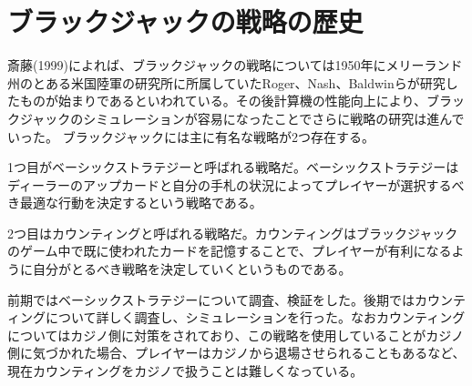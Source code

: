 
\section{ブラックジャックの戦略の歴史}
斎藤(1999)によれば、ブラックジャックの戦略については1950年にメリーランド州のとある米国陸軍の研究所に所属していたRoger、Nash、Baldwinらが研究したものが始まりであるといわれている。その後計算機の性能向上により、ブラックジャックのシミュレーションが容易になったことでさらに戦略の研究は進んでいった。
ブラックジャックには主に有名な戦略が2つ存在する。

1つ目がベーシックストラテジーと呼ばれる戦略だ。ベーシックストラテジーはディーラーのアップカードと自分の手札の状況によってプレイヤーが選択するべき最適な行動を決定するという戦略である。

2つ目はカウンティングと呼ばれる戦略だ。カウンティングはブラックジャックのゲーム中で既に使われたカードを記憶することで、プレイヤーが有利になるように自分がとるべき戦略を決定していくというものである。

前期ではベーシックストラテジーについて調査、検証をした。後期ではカウンティングについて詳しく調査し、シミュレーションを行った。なおカウンティングについてはカジノ側に対策をされており、この戦略を使用していることがカジノ側に気づかれた場合、プレイヤーはカジノから退場させられることもあるなど、現在カウンティングをカジノで扱うことは難しくなっている。
